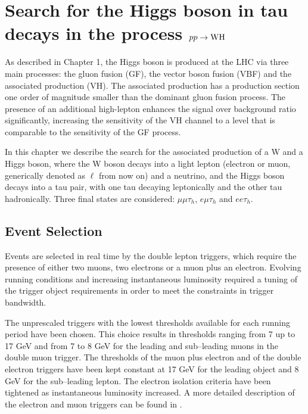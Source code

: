 \chapter[$pp\rightarrow\W\rm{H}$]{Search for the Higgs boson in tau decays in the process $pp\rightarrow\W\rm{H}$}%

As described in Chapter 1, the Higgs boson is produced at the LHC via three main processes: the gluon fusion (GF), the vector boson fusion (VBF) and the associated production (VH). The associated production has a production section one order of magnitude smaller than the dominant gluon fusion process. The presence of an additional high-\pT lepton enhances the signal over background ratio significantly,  increasing the sensitivity of the VH channel to a level that is comparable to the sensitivity of the GF process. 

In this chapter we describe the search for the associated production of a W and a Higgs boson, where the W boson decays into a light lepton (electron or muon, generically denoted as $\ell$ from now on) and a neutrino, and the Higgs boson decays into a tau pair, with one tau decaying leptonically and the other tau hadronically. Three final states are considered: $\mu\mu\tau_h$, $e\mu\tau_h$ and $ee\tau_h$. 

\section{Event Selection}

Events are selected in real time by the double lepton triggers, which require the presence of either two muons, two electrons or a muon plus an electron. Evolving running conditions and increasing instantaneous luminosity required a tuning of the trigger object requirements in order to meet the constraints in trigger bandwidth. %

The unprescaled triggers with the lowest \pT thresholds available for each running period have been chosen. This choice results in \pT thresholds ranging from 7 up to 17 GeV and from 7 to 8 GeV for the leading and sub--leading muons in the double muon trigger. The \pT thresholds of the muon plus electron and of the double electron triggers have been kept constant at 17 GeV for the leading object and 8 GeV for the sub--leading lepton. The electron isolation criteria have been tightened as instantaneous luminosity increased. %
A more detailed description of the electron and muon triggers can be found in \cite{Chatrchyan:2012xi,CMS-PAS-EGM-10-004}.

